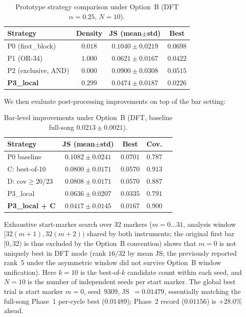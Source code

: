 \documentclass[conference,10pt,a4paper]{IEEEtran}
\begin{document}
\begin{table}[t]
\centering
\caption{Prototype strategy comparison under Option~B (DFT $\alpha=0.25$, $N=10$).}
\label{tab:module_proto}
\begin{tabular}{lccc}
\toprule
Strategy & Density & JS (mean$\pm$std) & Best \\
\midrule
P0 (first\_block) & $0.018$ & $0.1040 \pm 0.0219$ & $0.0698$ \\
P1 (OR-34) & $1.000$ & $0.0621 \pm 0.0167$ & $0.0422$ \\
P2 (exclusive, AND) & $0.000$ & $0.0900 \pm 0.0308$ & $0.0515$ \\
\textbf{P3\_local} & \textbf{$0.299$} & \textbf{$0.0474 \pm 0.0187$} & \textbf{$0.0226$} \\
\bottomrule
\end{tabular}
\end{table}

We then evaluate post-processing improvements on top of the bar setting:

\begin{table}[t]
\centering
\caption{Bar-level improvements under Option~B (DFT, baseline full-song
$0.0213 \pm 0.0021$).}
\label{tab:module}
\begin{tabular}{lcccc}
\toprule
Strategy & JS (mean$\pm$std) & Best & Cov. \\
\midrule
P0 baseline      & $0.1082 \pm 0.0241$ & $0.0701$ & $0.787$ \\
C: best-of-10    & $0.0800 \pm 0.0171$ & $0.0570$ & $0.913$ \\
D: cov$\ge$20/23 & $0.0808 \pm 0.0171$ & $0.0570$ & $0.887$ \\
P3\_local        & $0.0636 \pm 0.0207$ & $0.0335$ & $0.791$ \\
\textbf{P3\_local + C} & $\mathbf{0.0417 \pm 0.0145}$ & $\mathbf{0.0167}$ & $0.900$ \\
\bottomrule
\end{tabular}
\end{table}

Exhaustive start-marker search over 32 markers ($m = 0\ldots31$, analysis
window $[32(m+1),32(m+2))$ shared by both instruments; the original first
bar $[0,32)$ is thus excluded by the Option~B convention) shows that
$m=0$ is not uniquely best in DFT mode (rank $16/32$ by mean JS; the
previously reported rank~5 under the asymmetric window did not survive
Option~B window unification). Here $k=10$ is the best-of-$k$ candidate
count within each seed, and $N=10$ is the number of independent seeds
per start marker. The global best trial is start marker $m=0$, seed~9309,
JS~$=0.01479$, essentially matching the full-song Phase~1 per-cycle best
($0.01489$); Phase~2 record ($0.01156$) is $+28.0\%$ ahead.
\end{document}
